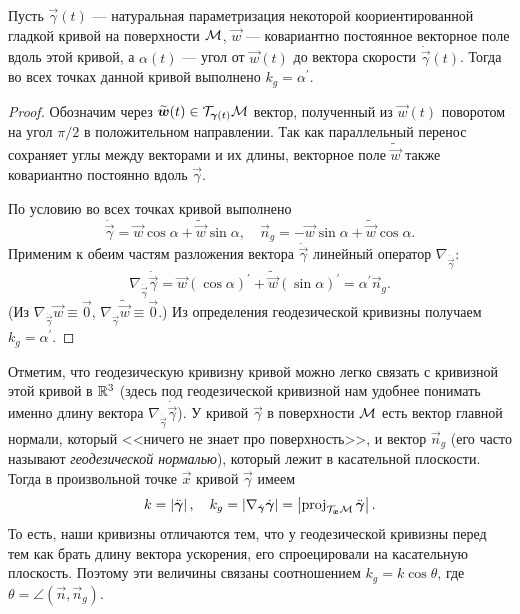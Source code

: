 
\begin{proposition} \label{proposition:AngleGeodesic}
	Пусть $\vec{\gamma}(t)$ --- натуральная параметризация некоторой коориентированной гладкой кривой на поверхности $\mathcal{M}$, $\vec{w}$ --- ковариантно постоянное векторное поле вдоль этой кривой, а $\alpha(t)$ --- угол от $\vec{w}(t)$ до вектора скорости $\dot{\vec{\gamma}}(t)$. Тогда во всех точках данной кривой выполнено $k_g = \alpha^\prime$.
\end{proposition}

\begin{proof}
	Обозначим через $\widetilde{\boldsymbol{w}}(t) \in \mathcal{T}_{\boldsymbol{\gamma}(t)}\mathcal{M}$ вектор, полученный из $\vec{w}(t)$ поворотом на угол $\pi / 2$ в положительном направлении. Так как параллельный перенос сохраняет углы между векторами и их длины, векторное поле $\widetilde{\vec{w}}$ также ковариантно постоянно вдоль $\vec{\gamma}$.

	По условию во всех точках кривой выполнено
	\[
		\dot{\vec{\gamma}} = \vec{w}\cos\alpha + \widetilde{\vec{w}}\sin\alpha,\quad
		\vec{n}_g = -\vec{w}\sin\alpha + \widetilde{\vec{w}}\cos\alpha.
	\]
	Применим к обеим частям разложения вектора $\dot{\vec{\gamma}}$ линейный оператор $\nabla_{\dot{\vec{\gamma}}}$:
	\[
		\nabla_{\dot{\vec{\gamma}}}\dot{\vec{\gamma}} = \vec{w}(\cos\alpha)^\prime + \widetilde{\vec{w}}(\sin\alpha)^\prime = \alpha^\prime\vec{n}_g.
	\]
	(Из $\nabla_{\dot{\vec{\gamma}}}\vec{w} \equiv \vec{0}$, $\nabla_{\dot{\vec{\gamma}}}\widetilde{\vec{w}} \equiv \vec{0}$.) Из определения геодезической кривизны получаем $k_g = \alpha^\prime$.
\end{proof}

Отметим, что геодезическую кривизну кривой можно легко связать с кривизной этой кривой в $\mathbb{R}^3$ (здесь под геодезической кривизной нам удобнее понимать именно длину вектора $\nabla_{\dot{\vec{\gamma}}}\dot{\vec{\gamma}}$). У кривой $\vec{\gamma}$ в поверхности $\mathcal{M}$ есть вектор главной нормали, который <<ничего не знает про поверхность>>, и вектор $\vec{n}_g$ (его часто называют \textit{геодезической нормалью}), который лежит в касательной плоскости. Тогда в произвольной точке $\vec{x}$ кривой $\vec{\gamma}$ имеем
\[ %
	k = \abs{\ddot{\vec{\gamma}}},\quad k_g = \abs{\nabla_{\dot{\vec{\gamma}}}\dot{\vec{\gamma}}} = \abs{\proj_{\T_{\vec{x}}\M}\ddot{\vec{\gamma}}}.
\]
То есть, наши кривизны отличаются тем, что у геодезической кривизны перед тем как брать длину вектора ускорения, его спроецировали на касательную плоскость. Поэтому эти величины связаны соотношением $k_g = k\cos\theta$, где $\theta = \angle(\vec{n}, \vec{n}_g)$.

